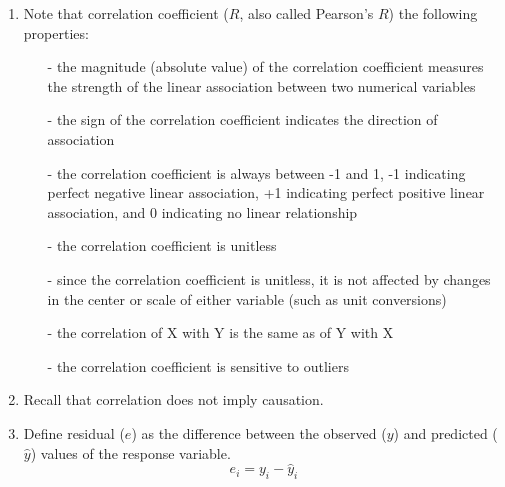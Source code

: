 \documentclass[11pt]{article}
\begin{document}
\begin{enumerate}
\item Note that correlation coefficient ($R$, also called Pearson's $R$) the following properties:
\begin{enumerate}
\item[-] the magnitude (absolute value) of the correlation coefficient measures the strength of the linear association between two numerical variables
\item[-] the sign of the correlation coefficient indicates the direction of association
\item[-] the correlation coefficient is always between -1 and 1, -1 indicating perfect negative linear association, +1 indicating perfect positive linear association, and 0 indicating no linear relationship
\item[-] the correlation coefficient is unitless
\item[-] since the correlation coefficient is unitless, it is not affected by changes in the center or scale of either variable (such as unit conversions)
\item[-] the correlation of X with Y is the same as of Y with X 
\item[-] the correlation coefficient is sensitive to outliers
\end{enumerate}

\item Recall that correlation does not imply causation.

\item Define residual ($e$) as the difference between the observed ($y$) and predicted ($\hat{y}$) values of the response variable.
\[ e_i = y_i - \hat{y}_i \]

\end{enumerate}
\end{document}
